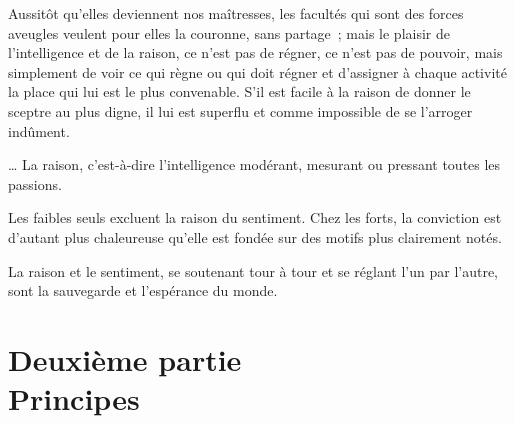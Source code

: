 \documentclass[french,twoside]{book} %
\newcommand{\astermono}{\medskip\centerline{\color{rubric}\large\selectfont{\syms ✻}}\medskip\par}%
\newcommand\chapteropen{} %
\newcommand\chaptercont{} %
\newcommand\chapterclose{} %
\begin{document}
\astermono

\noindent Aussitôt qu’elles deviennent nos maîtresses, les facultés qui sont des forces aveugles veulent pour elles la couronne, sans partage ; mais le plaisir de l’intelligence et de la raison, ce n’est pas de régner, ce n’est pas de pouvoir, mais simplement de voir ce qui règne ou qui doit régner et d’assigner à chaque activité la place qui lui est le plus convenable. S’il est facile à la raison de donner le sceptre au plus digne, il lui est superflu et comme impossible de se l’arroger indûment.\par

\astermono

\noindent … La raison, c’est-à-dire l’intelligence modérant, mesurant ou pressant toutes les passions.\par

\astermono

\noindent Les faibles seuls excluent la raison du sentiment. Chez les forts, la conviction est d’autant plus chaleureuse qu’elle est fondée sur des motifs plus clairement notés.\par

\astermono

\noindent La raison et le sentiment, se soutenant tour à tour et se réglant l’un par l’autre, sont la sauvegarde et l’espérance du monde.
\chapterclose


\chapteropen
\chapter[Deuxième partie. Principes]{Deuxième partie \\
Principes}\renewcommand{\leftmark}{Deuxième partie \\
Principes}


\chaptercont
\end{document}
